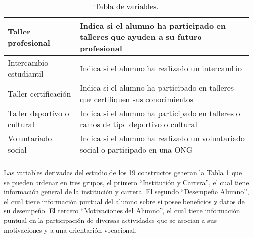 \begin{longtable}{| p{4cm}| p{8cm} |}
Taller profesional  & Indica si el alumno ha participado en talleres que ayuden a su futuro profesional\\ \hline
Intercambio estudiantil & Indica si el alumno ha realizado un intercambio\\ \hline
Taller certificación & Indica si el alumno ha participado en talleres que certifiquen sus conocimientos \\ \hline
Taller deportivo o cultural &  Indica si el alumno ha participado en talleres o ramos de tipo deportivo o cultural\\ \hline
Voluntariado social  & Indica si el alumno ha realizado un voluntariado social o participado en una ONG\\ \hline

	
	\caption{Tabla de variables.}
	\label{tabla:Tablou de variables}
\end{longtable}	

Las variables derivadas del estudio de los 19 constructos generan la Tabla \ref{tabla:Tablou de variables} que se pueden ordenar en tres grupos, el primero ``Institución y Carrera'', el cual tiene información general de la institución y carrera. El segundo ``Desempeño Alumno'', el cual tiene información puntual del alumno sobre si posee beneficios y datos de su desempeño. El tercero ``Motivaciones del Alumno'', el cual tiene información puntual en la participación de diversas actividades que se asocian a sus motivaciones y a una orientación vocacional.\\

